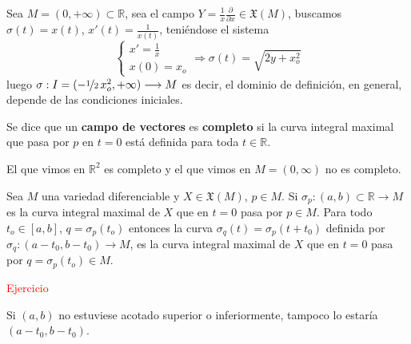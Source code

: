 \begin{ejem}
    Sea $M=(0, +\infty) \subset \mathbb R$, sea el campo $Y=\frac{1}{x} \frac{\partial}{\partial x} \in \mathfrak X(M)$, buscamos $\sigma(t)=x(t)$, $x'(t) = \frac{1}{x(t)}$, teni\'endose el sistema
    $$\begin{cases}
        x' = \frac{1}{x} \\ x(0)=x_o
    \end{cases} \Rightarrow \sigma(t) = \sqrt{2y+x_o^2}$$
    luego $\sigma: I = (-\nicefrac{1}{2} \, x_o^2, +\infty) \longrightarrow M$ es decir, el dominio de definici\'on, en general, depende de las condiciones iniciales. 
\end{ejem}

\begin{defi}
Se dice que un \textbf{campo de vectores} es \textbf{completo} si la curva integral maximal que pasa por $p$ en $t=0$ está definida para toda $t \in \mathbb{R}$.
\end{defi}
\begin{ejem}
    El que vimos en $\mathbb R^2$ es completo y el que vimos en $M=(0,\infty)$ no es completo.
\end{ejem}

\begin{prop}
Sea $M$ una variedad diferenciable y $X \in \mathfrak{X}(M)$, $p \in M$. Si $\sigma_p:(a,b)\subset \mathbb{R}\to M$ es la curva integral maximal de $X$ que en $t=0$ pasa por $p \in M$. Para todo $t_o \in [a,b]$, $q=\sigma_p(t_o)$ entonces la curva $\sigma_q(t) = \sigma_p(t + t_0)$ definida por $\sigma_q:(a-t_0,b-t_0) \to M$, es la curva integral maximal de $X$ que en $t=0$ pasa por $q = \sigma_p(t_o) \in M$.
\end{prop}
\begin{dem}
\textcolor{red}{Ejercicio}
\end{dem}

\begin{obs}
Si $(a,b)$ no estuviese acotado superior o inferiormente, tampoco lo estaría $(a-t_0,b-t_0)$.
\end{obs}

